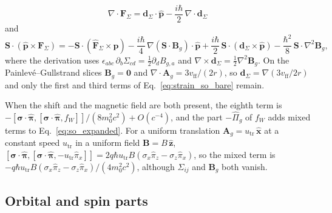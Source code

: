 \documentclass[aps,prd,onecolumn,tightenlines,nofootinbib,notitlepage,11pt,floatfix]{revtex4-2}
\theoremstyle{indentedtheorem}
\begin{document}
\begin{enumerate}[label=(\alph*)]
\begin{equation}
    \nabla\cdot\mathbf{F}_\Sigma = \mathbf{d}_\Sigma\cdot\hat{\mathbf{p}} - \frac{i\hbar}{2}\,\nabla\cdot\mathbf{d}_\Sigma
    \label{eq:strain_darwin_bare}
\end{equation}
and
\begin{equation}
    \mathbf{S}\cdot(\hat{\mathbf{p}}\times\mathbf{F}_\Sigma) = -\mathbf{S}\cdot(\hat{\mathbf{F}}_\Sigma\times\hat{\mathbf{p}}) - \frac{i\hbar}{4}\,\nabla(\mathbf{S}\cdot\mathbf{B}_g)\cdot\hat{\mathbf{p}} + \frac{i\hbar}{2}\,\mathbf{S}\cdot(\mathbf{d}_\Sigma\times\hat{\mathbf{p}}) - \frac{\hbar^2}{8}\,\mathbf{S}\cdot\nabla^2\mathbf{B}_g ,
    \label{eq:strain_so_bare}
\end{equation}
where the derivation uses $\epsilon_{abc}\,\partial_b\Sigma_{cd} = \tfrac{1}{2}\partial_dB_{g,a}$ and $\nabla\times\mathbf{d}_\Sigma=\tfrac{1}{2}\nabla^2\mathbf{B}_g$. On the Painlev\'e--Gullstrand slices $\mathbf{B}_g=\mathbf{0}$ and $\nabla\cdot\mathbf{A}_g = 3v_\text{ff}/(2r)$, so $\mathbf{d}_\Sigma=\nabla(3v_\text{ff}/2r)$ and only the first and third terms of Eq.~\eqref{eq:strain_so_bare} remain.
\end{enumerate}
When the shift and the magnetic field are both present, the eighth term is $-[\boldsymbol{\sigma}\cdot\hat{\boldsymbol{\pi}},[\boldsymbol{\sigma}\cdot\hat{\boldsymbol{\pi}},f_W]]/(8m_0^2c^2) + O(c^{-4})$, and the part $-\hat{\Pi}_g$ of $f_W$ adds mixed terms to Eq.~\eqref{eq:so_expanded}. For a uniform translation $\mathbf{A}_g = u_\text{tr}\,\hat{\mathbf{x}}$ at a constant speed $u_\text{tr}$ in a uniform field $\mathbf{B} = B\,\hat{\mathbf{z}}$, $[\boldsymbol{\sigma}\cdot\hat{\boldsymbol{\pi}},[\boldsymbol{\sigma}\cdot\hat{\boldsymbol{\pi}},-u_\text{tr}\hat{\pi}_x]] = 2q\hbar u_\text{tr}B(\sigma_x\hat{\pi}_z-\sigma_z\hat{\pi}_x)$, so the mixed term is $-q\hbar u_\text{tr}B(\sigma_x\hat{\pi}_z-\sigma_z\hat{\pi}_x)/(4m_0^2c^2)$, although $\Sigma_{ij}$ and $\mathbf{B}_g$ both vanish.


\subsection{Orbital and spin parts}
\label{sec:orbital_spin}
\end{document}
